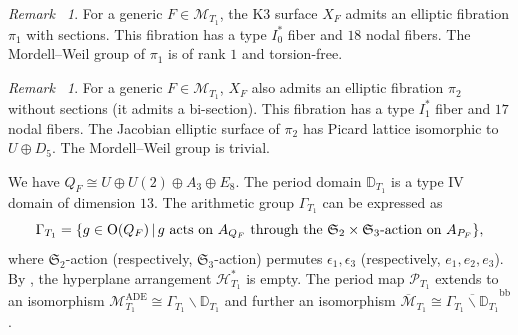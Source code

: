 \documentclass[12pt,reqno,a4paper]{amsart}
\theoremstyle{remark}
\newtheorem{rmk}[thm]{Remark~}
\theoremstyle{definition}
\newcommand{\DD}{\mathbb{D}}
\newcommand{\Prd}{\mathscr{P}}
\newcommand{\calH}{\mathcal{H}}
\newcommand{\calM}{\mathcal{M}}
\newcommand\Or{\mathrm{O}}
\newcommand{\Pic}{\mathrm{Pic}}
\newcommand{\MW}{\mathrm{MW}}
\newcommand{\bs}{\backslash}
\begin{document}


\begin{rmk}
    For a generic $F\in\calM_{T_1}$, the K3 surface $X_F$ admits an elliptic fibration $\pi_1$ with sections. This fibration has a type $I_0^*$ fiber and $18$ nodal fibers.
    The Mordell--Weil group of $\pi_1$ is of rank $1$ and torsion-free.
\end{rmk}
\begin{rmk}
    For a generic $F\in\calM_{T_1}$, $X_F$ also admits an elliptic fibration $\pi_2$ without sections (it admits a bi-section). This fibration has a type $I_1^*$ fiber and $17$ nodal fibers.
    The Jacobian elliptic surface of $\pi_2$ has Picard lattice isomorphic to $U\oplus D_5$. The Mordell--Weil group is trivial.
\end{rmk}

We have $Q_F\cong U\oplus U(2)\oplus A_3\oplus E_8$.
The period domain $\DD_{T_1}$ is a type IV domain of dimension $13$.
The arithmetic group $\Gamma_{T_1}$ can be expressed as
\begin{equation*}
    \Gamma_{T_1} = \{ g\in\Or(Q_F) \,|\, g \textup{ acts on } A_{Q_F} \textup{ through the } \mathfrak{S}_2\times\mathfrak{S}_3\textup{-action on } A_{P_F} \},
\end{equation*}
where $\mathfrak{S}_2$-action (respectively, $\mathfrak{S}_3$-action) permutes $\epsilon_1,\epsilon_3$ (respectively, $e_1,e_2,e_3$).
By \cite[Proposition 3.7]{yu2023moduli}, the hyperplane arrangement $\calH_{T_1}^*$ is empty.
The period map $\Prd_{T_1}$ extends to an isomorphism $\calM_{T_1}^{\mathrm{ADE}}\cong\Gamma_{T_1}\bs\DD_{T_1}$ and further an isomorphism $\overline{\calM}_{T_1}\cong \overline{\Gamma_{T_1}\bs\DD_{T_1}}^{\mathrm{bb}}$.

\end{document}
